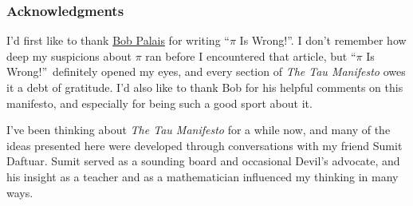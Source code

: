 
  \subsubsection{Acknowledgments} %
  \label{sec:acknowledgments}

I'd first like to thank \href{http://www.math.utah.edu/~palais}{Bob Palais} for writing ``$\pi$ Is Wrong!''. I don't remember how deep my suspicions about $\pi$ ran before I encountered that article, but ``$\pi$ Is Wrong!''\ definitely opened my eyes, and every section of \emph{The Tau Manifesto} owes it a debt of gratitude. I'd also like to thank Bob for his helpful comments on this manifesto, and especially for being such a good sport about it.

I've been thinking about \emph{The Tau Manifesto} for a while now, and many of the ideas presented here were developed through conversations with my friend Sumit Daftuar. Sumit served as a sounding board and occasional Devil's advocate, and his insight as a teacher and as a mathematician influenced my thinking in many ways.

